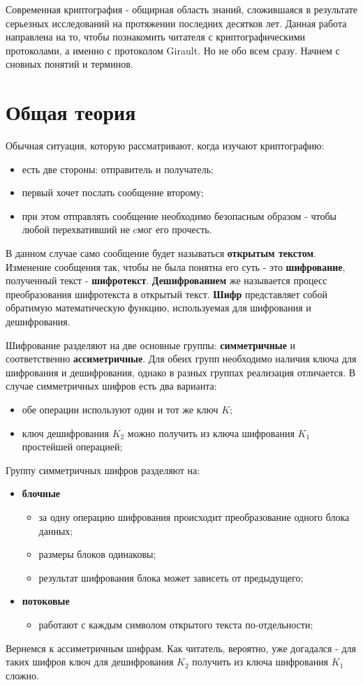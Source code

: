 \documentclass[a4paper]{article}
\begin{document}
 Современная криптография - общирная область знаний, сложившаяся в результате серьезных исследований на протяжении последних десятков лет. 
 Данная работа направлена на то,
  чтобы познакомить читателя с криптографическими протоколами, а именно с протоколом Girault. Но не обо всем сразу. Начнем с сновных понятий и терминов.

\section{Общая теория}

Обычная ситуация, которую рассматривают, когда изучают криптографию:
\begin{itemize}
    \item есть две стороны: отправитель и получатель;
    \item первый хочет послать сообщение второму;
    \item при этом отправлять сообщение необходимо безопасным образом -  чтобы любой перехвативший не cмог его прочесть.
\end{itemize}
\par В данном случае само сообщение будет называться \textbf{открытым текстом}. Изменение сообщения так, чтобы не была понятна его суть - это \textbf{шифрование}, полученный текст - \textbf{шифротекст}.
\textbf{Дешифрованием} же называется процесс преобразования шифротекста в открытый текст. \textbf{Шифр} представляет собой обратимую математическую функцию, используемая для шифрования и дешифрования.
 
\par Шифрование разделяют на две основные группы: \textbf{симметричные} и соответственно \textbf{ассиметричные}. Для обеих групп необходимо наличия ключа для шифрования и дешифрования, однако в разных группах реализация отличается. В случае симметричных шифров есть два варианта: 
\begin{itemize}
    \item обе операции используют один и тот же ключ $K$;
    \item ключ дешифрования $K_2$ можно получить из ключа шифрования $K_1$ простейшей операцией;
\end{itemize}
Группу симметричных шифров разделяют на:
\begin{itemize}
    \item \textbf{блочные} 
    \begin{itemize}
        \item за одну операцию шифрования происходит преобразование одного блока данных;
        \item размеры блоков одинаковы;
        \item результат шифрования блока может зависеть от предыдущего;
    \end{itemize}
    \item \textbf{потоковые} 
    \begin{itemize}
        \item работают с каждым символом открытого текста по-отдельности;
        \end{itemize}
\end{itemize}
Вернемся к ассиметричным шифрам. Как читатель, вероятно, уже догадался  - для таких шифров ключ для дешифрования $K_2$ получить из ключа шифрования $K_1$ сложно. 
\end{document}
